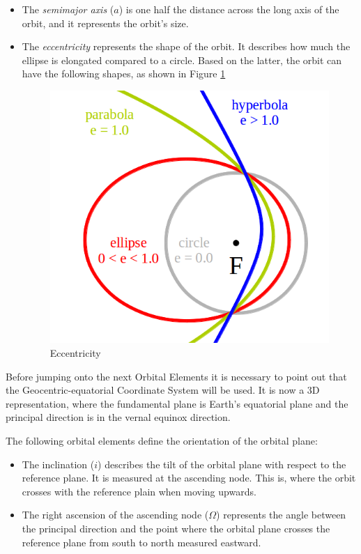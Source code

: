 \begin{itemize}
\item The \emph{semimajor axis} ($a$) is one half the distance across the long axis of the orbit, and it represents the orbit's size.
\item The \emph{eccentricity} represents the shape of the orbit. It describes how much the ellipse is elongated compared to a circle. Based on the latter, the orbit can have the following shapes, as shown in Figure \ref{f2.2}

\begin{figure}[H]
\centerline{\includegraphics[scale=0.35]{images/Eccentricity.png}}
\caption{Eccentricity}
\label{f2.2}
\end{figure}

\end{itemize}


Before jumping onto the next Orbital Elements it is necessary to point out that the Geocentric-equatorial Coordinate System will be used. It is now a 3D representation, where the fundamental plane is Earth's equatorial plane and the principal direction is in the vernal equinox direction.

The following orbital elements define the orientation of the orbital plane:

\begin{itemize}
\item The inclination ($i$) describes the tilt of the orbital plane with respect to the reference plane. It is measured at the ascending node. This is, where the orbit crosses with the reference plain when moving upwards.
\item The right ascension of the ascending node ($\Omega$) represents the angle between the principal direction and the point where the orbital plane crosses the reference plane from south to north measured eastward. 
\end{itemize}

